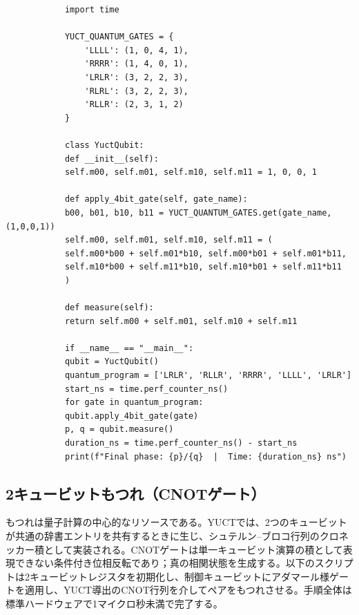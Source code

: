 \documentclass[11pt,a4paper]{article}
\begin{document}
	\begin{tcolorbox}[title=YUCT 1キュービットエミュレータ（Python）, breakable]
		\begin{lstlisting}
			import time
			
			YUCT_QUANTUM_GATES = {
				'LLLL': (1, 0, 4, 1),
				'RRRR': (1, 4, 0, 1),
				'LRLR': (3, 2, 2, 3),
				'RLRL': (3, 2, 2, 3),
				'RLLR': (2, 3, 1, 2)
			}
			
			class YuctQubit:
			def __init__(self):
			self.m00, self.m01, self.m10, self.m11 = 1, 0, 0, 1
			
			def apply_4bit_gate(self, gate_name):
			b00, b01, b10, b11 = YUCT_QUANTUM_GATES.get(gate_name, (1,0,0,1))
			self.m00, self.m01, self.m10, self.m11 = (
			self.m00*b00 + self.m01*b10, self.m00*b01 + self.m01*b11,
			self.m10*b00 + self.m11*b10, self.m10*b01 + self.m11*b11
			)
			
			def measure(self):
			return self.m00 + self.m01, self.m10 + self.m11
			
			if __name__ == "__main__":
			qubit = YuctQubit()
			quantum_program = ['LRLR', 'RLLR', 'RRRR', 'LLLL', 'LRLR']
			start_ns = time.perf_counter_ns()
			for gate in quantum_program:
			qubit.apply_4bit_gate(gate)
			p, q = qubit.measure()
			duration_ns = time.perf_counter_ns() - start_ns
			print(f"Final phase: {p}/{q}  |  Time: {duration_ns} ns")
		\end{lstlisting}
	\end{tcolorbox}
	
	\subsection{2キュービットもつれ（CNOTゲート）}
	
	もつれは量子計算の中心的なリソースである。YUCTでは、2つのキュービットが共通の辞書エントリを共有するときに生じ、シュテルン–ブロコ行列のクロネッカー積として実装される。CNOTゲートは単一キュービット演算の積として表現できない条件付き位相反転であり；真の相関状態を生成する。以下のスクリプトは2キュービットレジスタを初期化し、制御キュービットにアダマール様ゲートを適用し、YUCT導出のCNOT行列を介してペアをもつれさせる。手順全体は標準ハードウェアで1マイクロ秒未満で完了する。
	
\end{document}
